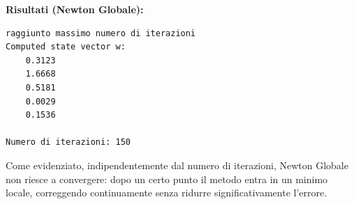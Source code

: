 \documentclass[11pt]{article}
\begin{document}
\vspace{1em}
\textbf{Risultati (Newton Globale):}

\begin{lstlisting}[style=console]
raggiunto massimo numero di iterazioni
Computed state vector w:
    0.3123
    1.6668
    0.5181
    0.0029
    0.1536

Numero di iterazioni: 150
\end{lstlisting}
Come evidenziato, indipendentemente dal numero di iterazioni, Newton Globale non riesce a convergere: dopo un certo punto il metodo entra in un minimo locale, correggendo continuamente senza ridurre significativamente l'errore.
\end{document}
